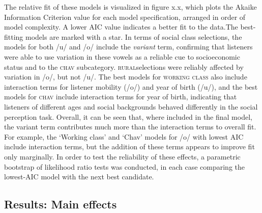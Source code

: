\documentclass[PWPL]{article}
\begin{document}
 The relative fit of these models is visualized in figure x.x, which plots the Akaike Information Criterion value for each model specification, arranged in order of model complexity. A lower AIC value indicates a better fit to the data.The best-fitting models are marked with a star. In terms of social class selections, the models for both /u/ and /o/ include the \textit{variant} term, confirming that listeners were able to use variation in these vowels as a reliable cue to socioeconomic status and to the \textsc{chav} subcategory. \textsc{rural}selections were reliably affected by variation in /o/, but not /u/. The best models for \textsc{working class} also include interaction terms for listener mobility (/o/) and year of birth (/u/), and the best models for \textsc{chav} include interaction terms for year of birth, indicating that listeners of different ages and social backgrounds behaved differently in the social perception task. Overall, it can be seen that, where included in the final model, the variant term contributes much more than the interaction terms to overall fit. For example, the `Working class' and `Chav' models for /o/ with lowest AIC include interaction terms, but the addition of these terms appears to improve fit only marginally. In order to test the reliability of these effects, a parametric bootstrap of likelihood ratio tests was conducted, in each case comparing the lowest-AIC model with the next best candidate. 

\subsection{Results: Main effects}
\end{document}
